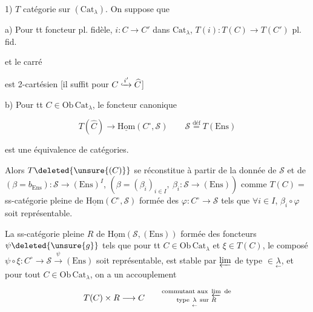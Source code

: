 1) $T$ catégorie  sur $(\mathrm{Cat}_\lambda)$. On suppose que 

a) Pour tt foncteur pl. fidèle, $i:C\to C'$ dans $\mathrm{Cat}_\lambda$, $T(i):T(C)\to T(C')$ pl. fid.

 et le carré


est 2-cartésien [il  suffit pour $C\lhook\joinrel\xrightarrow{i'}\widehat C$]


b) Pour tt $C\in\mathrm{Ob}\,\mathrm{Cat}_\lambda$, le foncteur canonique

\[T(\widehat C)\longrightarrow\underline{\mathrm{Hom}}(C^\circ,\mathscr S)\qquad \mathscr S\overset{\mathrm{déf}}=T(\mathrm{Ens})\]

est une équivalence de catégories.

Alors $T\deleted{\unsure{(C)}}$ se réconstitue à partir de la donnée de $\mathscr S$ et de $(\beta=b_{\mathrm{Ens}}):\mathscr S\to(\mathrm{Ens})^I$, $(\beta=(\beta_i)_{i\in I},\ \beta_i:\mathscr S\to(\mathrm{Ens}))$ comme $T(C)=$ ss-catégorie pleine de $\underline{\mathrm{Hom}}(C^\circ,\mathscr S)$ formée des $\varphi:C^\circ\to\mathscr S$ tels que $\forall i\in I$, $\beta_i\circ\varphi$ soit représentable.


 La ss-catégorie pleine $R$ de $\underline{\mathrm{Hom}}(\mathscr S,(\mathrm{Ens}))$ formée des foncteurs $\psi\deleted{\unsure{g}}$ tels que pour tt $C\in\mathrm{Ob}\,\mathrm{Cat}_\lambda$ \deleted{\unsure{$\xi$}} et $\xi\in T(C)$, le composé $\psi\circ\xi:C^\circ\longrightarrow\mathscr S\xrightarrow{\psi}(\mathrm{Ens})$ soit représentable, est stable par $\varprojlim$ de type $\in\underset{\leftarrow}{\lambda}$,  et pour tout $C\in\mathrm{Ob}\,\mathrm{Cat}_\lambda$, on a un accouplement

\[T(C)\times R\longrightarrow C\qquad\substack{\text{commutant aux }\varprojlim\text{ de}\\\text{type }\underset{\leftarrow}{\lambda}\text{ sur }R}\]

